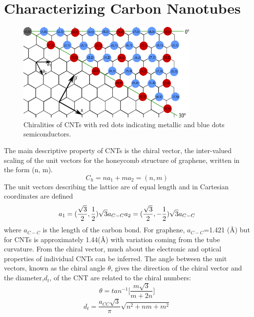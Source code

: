 \section{Characterizing Carbon Nanotubes}
\begin{figure}[htb!]
	\centering
	\includegraphics[width=0.8\textwidth]{./Figures/CNTs/chiral.png}
	\caption{Chiralities of CNTs with red dots indicating metallic and blue dots semiconductors. }
	\label{fig:chiralities}
\end{figure}
The main descriptive property of CNTs is the chiral vector, the inter-valued scaling of the unit vectors for the honeycomb structure of graphene, written in the form (n, m).
\begin{equation}
	C_h = na_1 + ma_2 = (n, m)
\end{equation}
The unit vectors describing the lattice are of equal length and in Cartesian coordinates are defined
\begin{equation}
	a_1 = (\frac{\sqrt3}{2}, \frac{1}{2})\sqrt{3}a_{C-C}\\
	a_2 = (\frac{\sqrt3}{2}, -\frac{1}{2})\sqrt{3}a_{C-C}
	\label{unit_vecs}
\end{equation}
 where $a_{C-C}$ is the length of the carbon bond. For graphene, $a_{C-C}$=1.421 (\AA) but for CNTs is approximately 1.44(\AA) with variation coming from the tube curvature\cite{saito}. From the chiral vector, much about the electronic and optical properties of individual CNTs can be inferred. The angle between the unit vectors, known as the chiral angle $\theta$, gives the direction of the chiral vector and the diameter,$d_t$, of the CNT are related to the chiral numbers:
\begin{equation}
	\theta = tan^{-1}\Bigg[\frac{m\sqrt{3}}{m + 2n}\Bigg]
\end{equation}
\begin{equation}
	d_t = \frac{a_{CC}\sqrt{3}}{\pi} \sqrt{n^2 + nm + m^2}
\end{equation}

